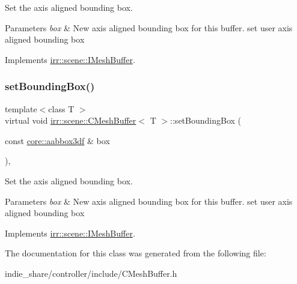 Set the axis aligned bounding box. 


\begin{DoxyParams}{Parameters}
{\em box} & New axis aligned bounding box for this buffer. set user axis aligned bounding box \\
\hline
\end{DoxyParams}


Implements \hyperlink{classirr_1_1scene_1_1IMeshBuffer_adbbfb7757dfbba7357193d2280893df6}{irr\+::scene\+::\+I\+Mesh\+Buffer}.

\mbox{\label{classirr_1_1scene_1_1CMeshBuffer_ab5a21d48a5af73f1ef880a48c3798a67}} 
\subsubsection{\texorpdfstring{set\+Bounding\+Box()}{setBoundingBox()}\hspace{0.1cm}{\footnotesize\ttfamily [2/2]}}
{\footnotesize\ttfamily template$<$class T $>$ \\
virtual void \hyperlink{classirr_1_1scene_1_1CMeshBuffer}{irr\+::scene\+::\+C\+Mesh\+Buffer}$<$ T $>$\+::set\+Bounding\+Box (\begin{DoxyParamCaption}\item[{const \hyperlink{namespaceirr_1_1core_a60f4b4c744aba55f10530d503c6ecb04}{core\+::aabbox3df} \&}]{box }\end{DoxyParamCaption})\hspace{0.3cm}{\ttfamily [inline]}, {\ttfamily [virtual]}}



Set the axis aligned bounding box. 


\begin{DoxyParams}{Parameters}
{\em box} & New axis aligned bounding box for this buffer. set user axis aligned bounding box \\
\hline
\end{DoxyParams}


Implements \hyperlink{classirr_1_1scene_1_1IMeshBuffer_adbbfb7757dfbba7357193d2280893df6}{irr\+::scene\+::\+I\+Mesh\+Buffer}.



The documentation for this class was generated from the following file\+:\begin{DoxyCompactItemize}
\item 
indie\+\_\+share/controller/include/C\+Mesh\+Buffer.\+h\end{DoxyCompactItemize}
